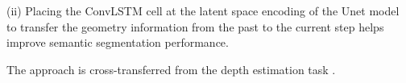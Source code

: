     (ii) Placing the ConvLSTM cell at the latent space encoding of the Unet model to transfer the geometry information from the past to the current step helps improve semantic segmentation performance. 
    
    The approach is cross-transferred from the depth estimation task \cite{52_hou2019multi} \cite{03_duzceker2021deepvideomvs}. 
    
    
%	
%
